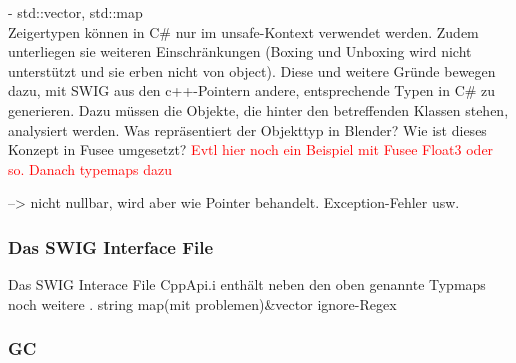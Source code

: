 		- std::vector, std::map\\
	

Zeigertypen können in C\# nur im unsafe-Kontext verwendet werden. Zudem unterliegen sie weiteren Einschränkungen (Boxing und Unboxing wird nicht unterstützt und sie erben nicht von object). Diese und weitere Gründe bewegen dazu, mit SWIG aus den c++-Pointern andere, entsprechende Typen in C\# zu generieren. Dazu müssen die Objekte, die hinter den betreffenden Klassen stehen, analysiert werden. Was repräsentiert der Objekttyp in Blender? Wie ist dieses Konzept in Fusee umgesetzt? \textcolor{red}{Evtl hier noch ein Beispiel mit Fusee Float3 oder so. Danach typemaps dazu}

--> nicht nullbar, wird aber wie Pointer behandelt. Exception-Fehler usw.

\subsubsection{Das SWIG Interface File}\label{subsubsec:Swiginterface}
Das SWIG Interace File CppApi.i enthält neben den oben genannte Typmaps noch weitere .
string
map(mit problemen)\&vector
ignore-Regex


\subsubsection{GC}\label{subsubsec:GC}
